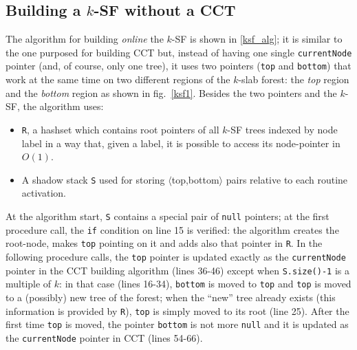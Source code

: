 \documentclass[a4paper,10pt]{report}
\begin{document}
\subsection{Building a $k$-SF without a CCT}

The algorithm for building \emph{online} the $k$-SF is shown in \cref{ksf_alg};
it is similar to the one purposed for building CCT but, instead of having
one single \verb|currentNode| pointer (and, of course, only one tree),
it uses two pointers (\verb|top| and \verb|bottom|) that work at the same time
on two different regions of the $k$-slab forest:
the \emph{top} region and the \emph{bottom} region as shown in fig.~\ref{ksf1}.
Besides the two pointers and the $k$-SF, the algorithm uses:

\begin{itemize}
\item \verb|R|, a hashset which contains root pointers of all $k$-SF trees indexed by node label in a way that, given a label, it is possible to access its node-pointer in $O(1)$.

\item A shadow stack \verb|S| used for storing $\langle$top,bottom$\rangle$ pairs relative to each routine activation.
\end{itemize}

\noindent
At the algorithm start, \verb|S| contains a special pair of \verb|null| pointers;
at the first procedure call, the \verb|if| condition on line 15 is verified:
the algorithm creates the root-node, makes \verb|top| pointing on it and adds also that pointer in \verb|R|. In the following procedure calls, the \verb|top| pointer is updated exactly as the \verb|currentNode| pointer in the CCT building algorithm (lines 36-46) except when \verb|S.size()-1| is a multiple of $k$: in that case (lines 16-34), \verb|bottom| is moved to \verb|top| and \verb|top| is moved to a (possibly) new tree of the forest; when the ``new'' tree already exists (this information is provided by \verb|R|), \verb|top| is simply moved to its root (line 25). After the first time \verb|top| is moved, the pointer \verb|bottom| is not more \verb|null| and it is updated as the \verb|currentNode| pointer in CCT (lines 54-66).
\end{document}
